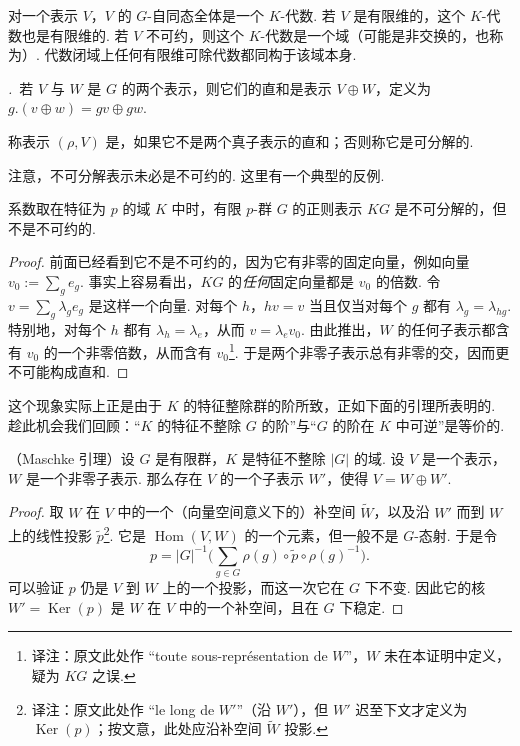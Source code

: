 \begin{remark*}
对一个表示 $V$，$V$ 的 $G$-自同态全体是一个 $K$-代数. 若 $V$ 是有限维的，这个 $K$-代数也是有限维的. 若 $V$ 不可约，则这个 $K$-代数是一个域（可能是非交换的，也称为）. 代数闭域上任何有限维可除代数都同构于该域本身.
\end{remark*}

\emph{.}~若 $V$ 与 $W$ 是 $G$ 的两个表示，则它们的直和是表示 $V\oplus W$，定义为 $g.(v\oplus w)=gv\oplus gw$.

\begin{definition}\label{def:fg-4-1-9}
称表示 $(\rho,V)$ 是，如果它不是两个真子表示的直和；否则称它是可分解的.
\end{definition}

注意，不可分解表示未必是不可约的. 这里有一个典型的反例.

\begin{proposition}\label{prop:fg-4-1-10}
系数取在特征为 $p$ 的域 $K$ 中时，有限 $p$-群 $G$ 的正则表示 $KG$ 是不可分解的，但不是不可约的.
\end{proposition}

\begin{proof}
前面已经看到它不是不可约的，因为它有非零的固定向量，例如向量 $v_0:=\sum_g e_g$. 事实上容易看出，$KG$ 的\emph{任何}固定向量都是 $v_0$ 的倍数. 令 $v=\sum_g\lambda_g e_g$ 是这样一个向量. 对每个 $h$，$hv=v$ 当且仅当对每个 $g$ 都有 $\lambda_g=\lambda_{hg}$. 特别地，对每个 $h$ 都有 $\lambda_h=\lambda_e$，从而 $v=\lambda_ev_0$. 由此推出，$W$ 的任何子表示都含有 $v_0$ 的一个非零倍数，从而含有 $v_0$\footnote{译注：原文此处作 ``toute sous-représentation de $W$''，$W$ 未在本证明中定义，疑为 $KG$ 之误.}. 于是两个非零子表示总有非零的交，因而更不可能构成直和.
\end{proof}

这个现象实际上正是由于 $K$ 的特征整除群的阶所致，正如下面的引理所表明的. 趁此机会我们回顾：``$K$ 的特征不整除 $G$ 的阶''与``$G$ 的阶在 $K$ 中可逆''是等价的.

\begin{proposition}\label{prop:fg-4-1-11}
（Maschke 引理）设 $G$ 是有限群，$K$ 是特征不整除 $|G|$ 的域. 设 $V$ 是一个表示，$W$ 是一个非零子表示. 那么存在 $V$ 的一个子表示 $W'$，使得 $V=W\oplus W'$.
\end{proposition}

\begin{proof}
取 $W$ 在 $V$ 中的一个（向量空间意义下的）补空间 $\tilde{W}$，以及沿 $W'$ 而到 $W$ 上的线性投影 $\tilde{p}$\footnote{译注：原文此处作 ``le long de $W'$''（沿 $W'$），但 $W'$ 迟至下文才定义为 $\operatorname{Ker}(p)$；按文意，此处应沿补空间 $\tilde{W}$ 投影.}. 它是 $\operatorname{Hom}(V,W)$ 的一个元素，但一般不是 $G$-态射. 于是令
\[
p=|G|^{-1}\Biggl(\sum_{g\in G}\rho(g)\circ\tilde{p}\circ\rho(g)^{-1}\Biggr).
\]
可以验证 $p$ 仍是 $V$ 到 $W$ 上的一个投影，而这一次它在 $G$ 下不变. 因此它的核 $W'=\operatorname{Ker}(p)$ 是 $W$ 在 $V$ 中的一个补空间，且在 $G$ 下稳定.
\end{proof}

